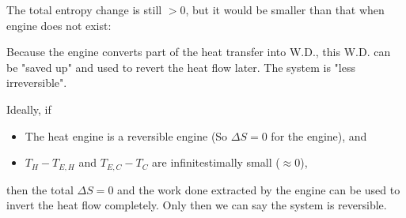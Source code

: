\documentclass[class=article, crop=false, 12pt]{standalone}
\begin{document}
The total entropy change is still $>0$,
but it would be smaller than that when engine does not exist:

Because the engine converts part of the heat transfer into W.D.,
this W.D. can be "saved up" and used to revert the heat flow later. 
The system is "less irreversible".


Ideally, if
\begin{itemize}
    \item The heat engine is a reversible engine (So $\Delta S = 0$ for the engine), and
    \item $T_H - T_{E,H}$ and $T_{E,C} - T_C$ are infinitestimally small ($\approx 0$),
\end{itemize}

then the total $\Delta S=0$ and the work done extracted by the engine can be used to invert the heat flow completely.
Only then we can say the system is reversible.\\
\end{document}
